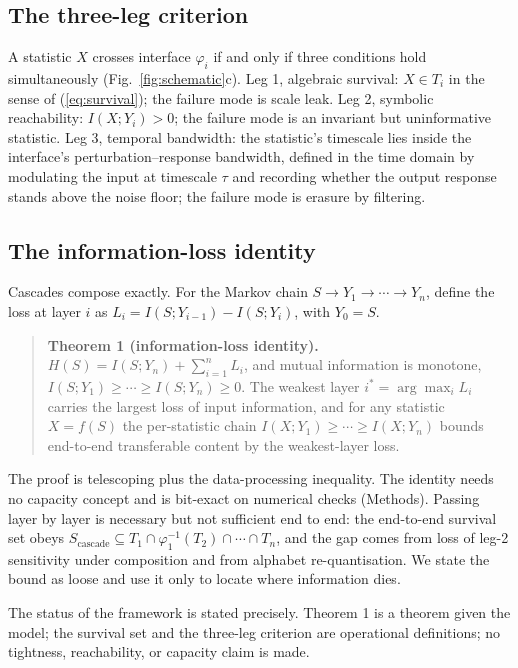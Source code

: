 \documentclass[11pt,a4paper]{article}
\begin{document}
\subsection{The three-leg criterion}

A statistic $X$ crosses interface $\varphi_i$ if and only if three conditions hold simultaneously (Fig.~\ref{fig:schematic}c). Leg 1, algebraic survival: $X\in T_i$ in the sense of (\ref{eq:survival}); the failure mode is scale leak. Leg 2, symbolic reachability: $I(X;Y_i)>0$; the failure mode is an invariant but uninformative statistic. Leg 3, temporal bandwidth: the statistic's timescale lies inside the interface's perturbation--response bandwidth, defined in the time domain by modulating the input at timescale $\tau$ and recording whether the output response stands above the noise floor; the failure mode is erasure by filtering.

\subsection{The information-loss identity}

Cascades compose exactly. For the Markov chain $S\to Y_1\to\cdots\to Y_n$, define the loss at layer $i$ as $L_i=I(S;Y_{i-1})-I(S;Y_i)$, with $Y_0=S$.

\begin{quote}
\textbf{Theorem 1 (information-loss identity).} $H(S)=I(S;Y_n)+\sum_{i=1}^{n}L_i$, and mutual information is monotone, $I(S;Y_1)\ge\cdots\ge I(S;Y_n)\ge0$. The weakest layer $i^*=\arg\max_i L_i$ carries the largest loss of input information, and for any statistic $X=f(S)$ the per-statistic chain $I(X;Y_1)\ge\cdots\ge I(X;Y_n)$ bounds end-to-end transferable content by the weakest-layer loss.
\end{quote}

\noindent The proof is telescoping plus the data-processing inequality. The identity needs no capacity concept and is bit-exact on numerical checks (Methods). Passing layer by layer is necessary but not sufficient end to end: the end-to-end survival set obeys $S_{\mathrm{cascade}}\subseteq T_1\cap\varphi_1^{-1}(T_2)\cap\cdots\cap T_n$, and the gap comes from loss of leg-2 sensitivity under composition and from alphabet re-quantisation. We state the bound as loose and use it only to locate where information dies.

The status of the framework is stated precisely. Theorem 1 is a theorem given the model; the survival set and the three-leg criterion are operational definitions; no tightness, reachability, or capacity claim is made.
\end{document}
